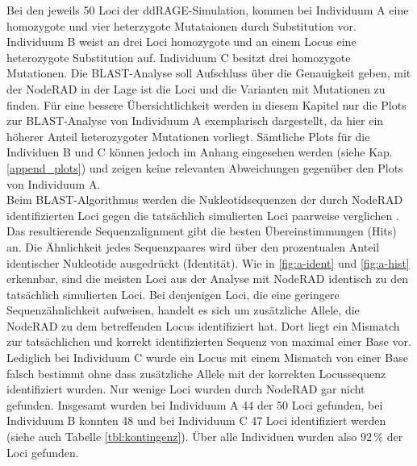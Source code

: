 Bei den jeweils 50 Loci der ddRAGE-Simulation, kommen bei Individuum A eine homozygote und vier heterzygote Mutataionen durch Substitution vor. Individuum B weist an drei Loci homozygote und an einem Locus eine heterozygote Substitution auf. Individuum C besitzt drei homozygote Mutationen. Die BLAST-Analyse soll Aufschluss über die Genauigkeit geben, mit der NodeRAD in der Lage ist die Loci und die Varianten mit Mutationen zu finden. Für eine bessere Übersichtlichkeit werden in diesem Kapitel nur die Plots zur BLAST-Analyse von Individuum A exemplarisch dargestellt, da hier ein höherer Anteil heterozygoter Mutationen vorliegt. Sämtliche Plots für die Individuen B und C können jedoch im Anhang eingesehen werden (siehe Kap. \ref{append_plots}) und zeigen keine relevanten Abweichungen gegenüber den Plots von Individuum A.\\

Beim BLAST-Algorithmus werden die Nukleotidsequenzen der durch NodeRAD identifizierten Loci gegen die tatsächlich simulierten Loci paarweise verglichen \cite{gaedeke_2007}. Das resultierende Sequenzalignment gibt die besten Übereinstimmungen (Hits) an. Die Ähnlichkeit jedes Sequenzpaares wird über den prozentualen Anteil identischer Nukleotide ausgedrückt (Identität). Wie in \autoref{fig:a-ident} und \autoref{fig:a-hist} erkennbar, sind die meisten Loci aus der Analyse mit NodeRAD identisch zu den tatsächlich simulierten Loci. Bei denjenigen Loci, die eine geringere Sequenzähnlichkeit aufweisen, handelt es sich um zusätzliche Allele, die NodeRAD zu dem betreffenden Locus identifiziert hat. Dort liegt ein Mismatch zur tatsächlichen und korrekt identifizierten Sequenz von maximal einer Base vor. Lediglich bei Individuum C wurde ein Locus mit einem Mismatch von einer Base falsch bestimmt ohne dass zusätzliche Allele mit der korrekten Locussequenz identifiziert wurden. Nur wenige Loci wurden durch NodeRAD gar nicht gefunden. Insgesamt wurden bei Individuum A 44 der 50 Loci gefunden, bei Individuum B konnten 48 und bei Individuum C 47 Loci identifiziert werden (siehe auch Tabelle \ref{tbl:kontingenz}). Über alle Individuen wurden also $92\, \%$ der Loci gefunden.\\

\newpage

